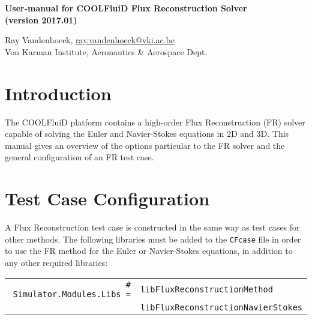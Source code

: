\documentclass[11pt]{article}
\newcommand{\noi}{\noindent}
\begin{document}
\pagestyle{empty}

\begin{center}
  {\fontsize{14}{20}\bf 
    User-manual for COOLFluiD Flux Reconstruction Solver \\
    (version 2017.01) \\[10pt]}
\end{center}

\begin{center}
  {Ray Vandenhoeck, \underline{ray.vandenhoeck@vki.ac.be} \\
    Von Karman Institute, Aeronautics \& Aerospace Dept.}
\end{center}

\section*{Introduction} 

\noi
The COOLFluiD platform \cite{lani05, lani06, phd:lani, phd:quintino, phd:wuilbaut} contains a high-order Flux Reconstruction (FR) solver capable of solving the Euler and Navier-Stokes equations in 2D and 3D. This manual gives an overview of the options particular to the FR solver and the general configuration of an FR test case.

\section{Test Case Configuration}

A Flux Reconstruction test case is constructed in the same way as test cases for other methods. The following libraries must be added to the {\tt CFcase} file in order to use the FR method for the Euler or Navier-Stokes equations, in addition to any other required libraries:

\begin{tabular}{r l}
    {\tt \quad\ \# Simulator.Modules.Libs =} & {\tt libFluxReconstructionMethod}\\
    & {\tt libFluxReconstructionNavierStokes}
\end{tabular}
\end{document}
